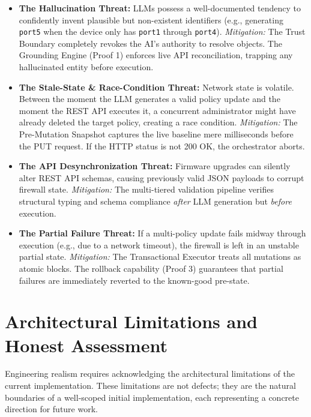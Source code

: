\begin{itemize}
    \item \textbf{The Hallucination Threat:} LLMs possess a well-documented tendency to confidently invent plausible but non-existent identifiers (e.g., generating \texttt{port5} when the device only has \texttt{port1} through \texttt{port4}). \emph{Mitigation:} The Trust Boundary completely revokes the AI's authority to resolve objects. The Grounding Engine (Proof 1) enforces live API reconciliation, trapping any hallucinated entity before execution.
    \item \textbf{The Stale-State \& Race-Condition Threat:} Network state is volatile. Between the moment the LLM generates a valid policy update and the moment the REST API executes it, a concurrent administrator might have already deleted the target policy, creating a race condition. \emph{Mitigation:} The Pre-Mutation Snapshot captures the live baseline mere milliseconds before the PUT request. If the HTTP status is not 200 OK, the orchestrator aborts.
    \item \textbf{The API Desynchronization Threat:} Firmware upgrades can silently alter REST API schemas, causing previously valid JSON payloads to corrupt firewall state. \emph{Mitigation:} The multi-tiered validation pipeline verifies structural typing and schema compliance \emph{after} LLM generation but \emph{before} execution.
    \item \textbf{The Partial Failure Threat:} If a multi-policy update fails midway through execution (e.g., due to a network timeout), the firewall is left in an unstable partial state. \emph{Mitigation:} The Transactional Executor treats all mutations as atomic blocks. The rollback capability (Proof 3) guarantees that partial failures are immediately reverted to the known-good pre-state.
\end{itemize}

\section{Architectural Limitations and Honest Assessment}
\label{sec:limits}

Engineering realism requires acknowledging the architectural limitations of the current implementation. These limitations are not defects; they are the natural boundaries of a well-scoped initial implementation, each representing a concrete direction for future work.

